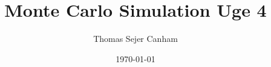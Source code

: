 \documentclass{article}
\title{Monte Carlo Simulation Uge 4}
\author{Thomas Sejer Canham}
\date{\today}
\theoremstyle{definition}
\theoremstyle{remark}
\begin{document}

\begin{titlepage}

    \maketitle
    \thispagestyle{empty}

\end{titlepage}
\end{document}
